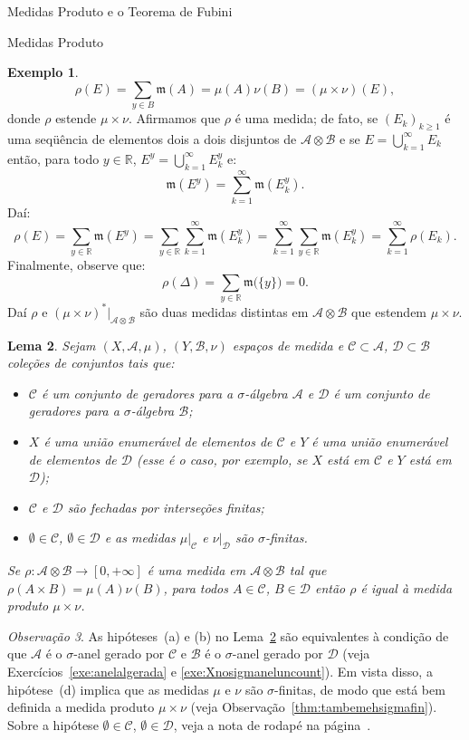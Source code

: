 \documentclass[oneside,final,11pt]{amsbook}
\newcommand{\R}{\mathds R}
\newcommand{\leb}{\mathfrak m}
\theoremstyle{remark}\newtheorem{exercise}{Exercício}[chapter]
\theoremstyle{remark}\newtheorem{*exercise}[exercise]{\hbox to 0pt{\hskip 0pt minus 1fil*}Exercício}
\theoremstyle{definition}\newtheorem{exdefin}{Definição}[chapter]
\theoremstyle{plain}\newtheorem{teo}{Teorema}[section]
\theoremstyle{plain}\newtheorem{lem}[teo]{Lema}
\theoremstyle{plain}\newtheorem{prop}[teo]{Proposição}
\theoremstyle{plain}\newtheorem{cor}[teo]{Corolário}
\theoremstyle{definition}\newtheorem{defin}[teo]{Definição}
\theoremstyle{remark}\newtheorem{rem}[teo]{Observação}
\theoremstyle{definition}\newtheorem{notation}[teo]{Notação}
\theoremstyle{definition}\newtheorem{convention}[teo]{Convenção}
\theoremstyle{definition}\newtheorem{example}[teo]{Exemplo}
\numberwithin{section}{chapter}
\numberwithin{equation}{section}
\begin{document}
\begin{chapter}{Medidas Produto e o Teorema de Fubini}
\begin{section}{Medidas Produto}
\begin{example}
\[\rho(E)=\sum_{y\in B}\leb(A)=\mu(A)\nu(B)=(\mu\times\nu)(E),\]
donde $\rho$ estende $\mu\times\nu$. Afirmamos que $\rho$ é uma medida; de fato, se $(E_k)_{k\ge1}$
é uma seqüência de elementos dois a dois disjuntos de $\mathcal A\otimes\mathcal B$ e se $E=\bigcup_{k=1}^\infty E_k$
então, para todo $y\in\R$, $E^y=\bigcup_{k=1}^\infty E^y_k$ e:
\[\leb(E^y)=\sum_{k=1}^\infty\leb(E^y_k).\]
Daí:
\[\rho(E)=\sum_{y\in\R}\leb(E^y)=\sum_{y\in\R}\sum_{k=1}^\infty\leb(E^y_k)
=\sum_{k=1}^\infty\sum_{y\in\R}\leb(E^y_k)=\sum_{k=1}^\infty\rho(E_k).\]
Finalmente, observe que:
\[\rho(\Delta)=\sum_{y\in\R}\leb\big(\{y\}\big)=0.\]
Daí $\rho$ e $(\mu\times\nu)^*\vert_{\mathcal A\otimes\mathcal B}$ são duas medidas distintas em $\mathcal A\otimes\mathcal B$
que estendem $\mu\times\nu$.
\end{example}

\begin{lem}\label{thm:ehproduto}
Sejam $(X,\mathcal A,\mu)$, $(Y,\mathcal B,\nu)$ espaços de medida e $\mathcal C\subset\mathcal A$,
$\mathcal D\subset\mathcal B$ coleções de conjuntos tais que:
\begin{itemize}
\item[(a)] $\mathcal C$ é um conjunto de geradores para a $\sigma$-álgebra $\mathcal A$ e
$\mathcal D$ é um conjunto de geradores para a $\sigma$-álgebra $\mathcal B$;
\item[(b)] $X$ é uma união enumerável de elementos de $\mathcal C$ e
$Y$ é uma união enumerável de elementos de $\mathcal D$ (esse é o caso, por exemplo, se $X$ está em $\mathcal C$
e $Y$ está em $\mathcal D$);
\item[(c)] $\mathcal C$ e $\mathcal D$ são fechadas por interseções finitas;
\item[(d)] $\emptyset\in\mathcal C$, $\emptyset\in\mathcal D$ e as medidas $\mu\vert_{\mathcal C}$ e $\nu\vert_{\mathcal D}$
são $\sigma$-finitas.
\end{itemize}
Se $\rho:\mathcal A\otimes\mathcal B\to[0,+\infty]$ é uma medida em $\mathcal A\otimes\mathcal B$ tal que
$\rho(A\times B)=\mu(A)\nu(B)$, para todos $A\in\mathcal C$, $B\in\mathcal D$ então $\rho$ é igual à medida
produto $\mu\times\nu$.
\end{lem}

\begin{rem}
As hipóteses~(a) e (b) no Lema~\ref{thm:ehproduto} são equivalentes à condição de que $\mathcal A$ é o $\sigma$-anel
gerado por $\mathcal C$ e $\mathcal B$ é o $\sigma$-anel gerado por $\mathcal D$ (veja Exercícios~\ref{exe:anelalgerada}
e \ref{exe:Xnosigmaneluncount}). Em vista disso, a hipótese~(d) implica que as medidas $\mu$ e $\nu$ são $\sigma$-finitas,
de modo que está bem definida a medida produto $\mu\times\nu$ (veja Observação~\ref{thm:tambemehsigmafin}).
Sobre a hipótese $\emptyset\in\mathcal C$, $\emptyset\in\mathcal D$, veja a nota de rodapé na página~\pageref{foot:sigmauniqueext}.
\end{rem}


\end{section}
\end{chapter}
\end{document}
